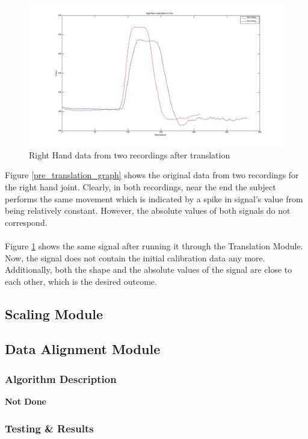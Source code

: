 \documentclass[a4paper]{article}
\begin{document}
\begin{figure}[h]
\centering
\includegraphics[scale=0.3]{R_H_Data_Relative_Torso.jpg}
\caption{Right Hand data from two recordings after translation}
\label{post_translation_graph}
\end{figure}

\noindent
Figure \ref{pre_translation_graph} shows the original data from two recordings for the right hand joint. Clearly, in both recordings, near the end the subject performs the same movement which is indicated by a spike in signal's value from being relatively constant. However, the absolute values of both signals do not correspond.
\\\\
\noindent
Figure \ref{post_translation_graph} shows the same signal after running it through the Translation Module. Now, the signal does not contain the initial calibration data any more. Additionally, both the shape and the absolute values of the signal are close to each other, which is the desired outcome.

\clearpage
\subsection{Scaling Module}
\subsection{Data Alignment Module}
\subsubsection{Algorithm Description}
\noindent
\textbf{Not Done}


\subsubsection{Testing \& Results}
\end{document}
